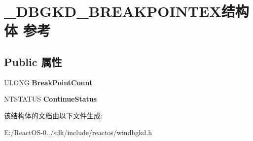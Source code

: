 \hypertarget{struct___d_b_g_k_d___b_r_e_a_k_p_o_i_n_t_e_x}{}\section{\+\_\+\+D\+B\+G\+K\+D\+\_\+\+B\+R\+E\+A\+K\+P\+O\+I\+N\+T\+E\+X结构体 参考}
\label{struct___d_b_g_k_d___b_r_e_a_k_p_o_i_n_t_e_x}
\subsection*{Public 属性}
\begin{DoxyCompactItemize}
\item 
\mbox{\label{struct___d_b_g_k_d___b_r_e_a_k_p_o_i_n_t_e_x_a73d3acc7d9744b053c10240b8d9d7ec3}} 
U\+L\+O\+NG {\bfseries Break\+Point\+Count}
\item 
\mbox{\label{struct___d_b_g_k_d___b_r_e_a_k_p_o_i_n_t_e_x_aa45185598e5c230d04fc49c56ba8c1b0}} 
N\+T\+S\+T\+A\+T\+US {\bfseries Continue\+Status}
\end{DoxyCompactItemize}


该结构体的文档由以下文件生成\+:\begin{DoxyCompactItemize}
\item 
E\+:/\+React\+O\+S-\/0../sdk/include/reactos/windbgkd.\+h\end{DoxyCompactItemize}
